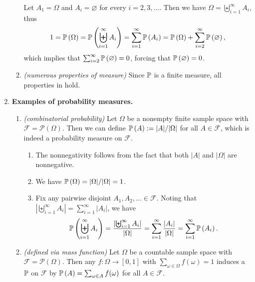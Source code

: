\begin{enumerate}
\begin{enumerate}
\begin{pf}
Let \(A_1=\Omega\) and \(A_i=\varnothing\) for every \(i=2,3,\dotsc\). Then we
have \(\Omega=\biguplus_{i=1}^{\infty}A_i\), thus
\[
1=\mathbb{P}\left(\Omega\right)=\mathbb{P}\left(\biguplus_{i=1}^{\infty}A_i\right)
=\sum_{i=1}^{\infty}\mathbb{P}\left(A_i\right)
=\mathbb{P}\left(\Omega\right)+\sum_{i=2}^{\infty}\mathbb{P}\left(\varnothing\right),
\]
which implies that \(\sum_{i=2}^{\infty}\mathbb{P}\left(\varnothing\right)=0\), forcing that
\(\mathbb{P}\left(\varnothing\right)=0\).
\end{pf}
\item \emph{(numerous properties of measure)} Since \(\mathbb{P}\) is a finite
measure, all properties in  hold.
\end{enumerate}
\item \textbf{Examples of probability measures.}
\begin{enumerate}
\item\label{it:comb-prob} \emph{(combinatorial probability)} Let \(\Omega\) be
a nonempty finite sample space with \(\mathcal{F}=\mathcal{P}(\Omega)\).  Then
we can define \(\mathbb{P}\left(A\right):=|A|/|\Omega|\) for all \(A\in\mathcal{F}\), which is
indeed a probability measure on \(\mathcal{F}\).

\begin{pf}
\begin{enumerate}[label={(\arabic*)}]
\item The nonnegativity follows from the fact that both \(|A|\) and
\(|\Omega|\) are nonnegative.
\item We have \(\mathbb{P}\left(\Omega\right)=|\Omega|/|\Omega|=1\).
\item Fix any pairwise disjoint \(A_1,A_2,\dotsc\in\mathcal{F}\). Noting that
\(\left|\biguplus_{i=1}^{\infty}A_i\right|=\sum_{i=1}^{\infty}|A_i|\), we have
\[
\mathbb{P}\left(\biguplus_{i=1}^{\infty}A_i\right)
=\frac{\left|\biguplus_{i=1}^{\infty}A_i\right|}{|\Omega|}
=\sum_{i=1}^{\infty}\frac{|A_i|}{|\Omega|}
=\sum_{i=1}^{\infty}\mathbb{P}\left(A_i\right).
\]
\end{enumerate}
\end{pf}
\item \emph{(defined via mass function)} Let \(\Omega\) be a countable sample
space with \(\mathcal{F}=\mathcal{P}(\Omega)\). Then any 
\(f:\Omega\to[0,1]\) with \(\sum_{\omega\in\Omega}^{}f(\omega)=1\) induces a
 \(\mathbb{P}\) on \(\mathcal{F}\) by
\(\mathbb{P}\left(A\right)=\sum_{\omega\in A}^{}f(\omega)\) for all \(A\in\mathcal{F}\).


\end{enumerate}
\end{enumerate}
